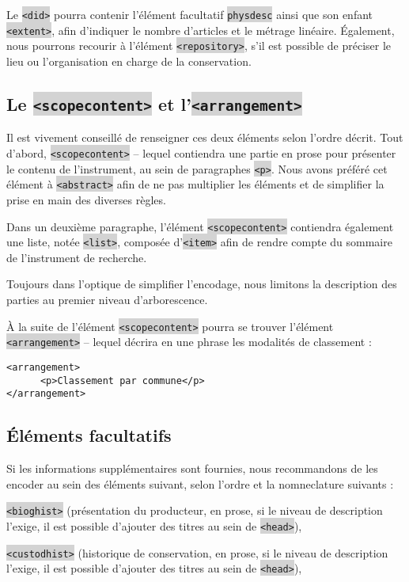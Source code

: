 \documentclass[hidelinks, 13pt]{report}
\newcommand{\code}[1]{\colorbox{LightGray}{\texttt{#1}}}
\begin{document}
	Le \code{<did>} pourra contenir l'élément facultatif \code{physdesc} ainsi que son enfant \code{<extent>}, afin d'indiquer le nombre d'articles et le métrage linéaire. Également, nous pourrons recourir à l'élément \code{<repository>}, s'il est possible de préciser le lieu ou l'organisation en charge de la conservation.
	
	\subsection{Le \code{<scopecontent>} et l'\code{<arrangement>}}
	
	Il est vivement conseillé de renseigner ces deux éléments selon l'ordre décrit. Tout d'abord, \code{<scopecontent>} -- lequel contiendra une partie en prose pour présenter le contenu de l'instrument, au sein de paragraphes \code{<p>}. Nous avons préféré cet élément à \code{<abstract>} afin de ne pas multiplier les éléments et de simplifier la prise en main des diverses règles.
	
	Dans un deuxième paragraphe, l'élément \code{<scopecontent>} contiendra également une liste, notée \code{<list>}, composée d'\code{<item>} afin de rendre compte du sommaire de l'instrument de recherche. 
	
	Toujours dans l'optique de simplifier l'encodage, nous limitons la description des parties au premier niveau d'arborescence.
	
	À la suite de l'élément \code{<scopecontent>} pourra se trouver l'élément \code{<arrangement>} -- lequel décrira en une phrase les modalités de classement :
	
\begin{lstlisting}[language=EAD]
<arrangement>
      <p>Classement par commune</p>
</arrangement>
\end{lstlisting}

	\subsection{Éléments facultatifs}
	
	Si les informations supplémentaires sont fournies, nous recommandons de les encoder au sein des éléments suivant, selon l'ordre et la nomneclature suivants :
	
	\code{<bioghist>} (présentation du producteur, en prose, si le niveau de description l'exige, il est possible d'ajouter des titres au sein de \code{<head>}),
	
	\code{<custodhist>} (historique de conservation, en prose, si le niveau de description l'exige, il est possible d'ajouter des titres au sein de \code{<head>}),
	
\end{document}
